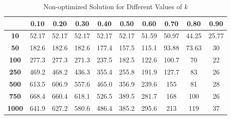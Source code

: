 \documentclass[12pt,a4paper]{article}
\begin{document}
\begin{table}[h!]
    \centering
    \setlength{\arrayrulewidth}{0.5mm} %
    \renewcommand{\arraystretch}{1.5} %
    \begin{tabular}{|c|c|c|c|c|c|c|c|c|c|}
    \hline
    \rowcolor{black!75} %
    & \color{white}\textbf{0.10} & \color{white}\textbf{0.20} & \color{white}\textbf{0.30} & \color{white}\textbf{0.40} & \color{white}\textbf{0.50} & \color{white}\textbf{0.60} & \color{white}\textbf{0.70} & \color{white}\textbf{0.80} & \color{white}\textbf{0.90} \\ \hline
    \cellcolor{black!75}\color{white}\textbf{10} & 52.17 & 52.17 & 52.17 & 52.17 & 52.17 & 51.59 & 50.97 & 44.25 & 25.77 \\ \hline
    \cellcolor{black!75}\color{white}\textbf{50} & 182.6 & 182.6 & 182.6 & 177.4 & 157.5 & 115.1 & 93.88 & 73.63 & 30 \\ \hline
    \cellcolor{black!75}\color{white}\textbf{100} & 277.3 & 277.3 & 271.3 & 237.5 & 182.5 & 122.6 & 100.7 & 70 & 22 \\ \hline
    \cellcolor{black!75}\color{white}\textbf{250} & 469.2 & 468.2 & 436.3 & 355.4 & 255.8 & 191.9 & 127.7 & 83 & 26 \\ \hline
    \cellcolor{black!75}\color{white}\textbf{500} & 613.5 & 606.9 & 557.6 & 465.0 & 356.9 & 239.6 & 155 & 81 & 28 \\ \hline
    \cellcolor{black!75}\color{white}\textbf{750} & 668.4 & 660.4 & 618.1 & 526.5 & 389.5 & 281.7 & 168 & 100 & 26 \\ \hline
    \cellcolor{black!75}\color{white}\textbf{1000} & 641.9 & 627.2 & 580.6 & 486.4 & 385.2 & 295.6 & 213 & 119 & 37 \\ \hline
    \end{tabular}
    \caption{Non-optimized Solution for Different Values of $k$}
\end{table}
\end{document}
